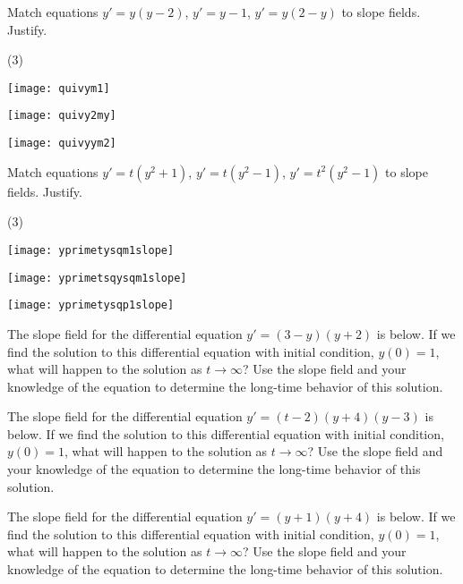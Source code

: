 \documentclass{ximera}
\begin{document}
\begin{exercise}
    Match equations $y'=y(y-2)$, $y'=y-1$, $y' = y(2-y)$ to slope fields. Justify.
    \begin{tasks}(3)
        \task \parbox[c]{1.75in}{\texttt{[image: quivym1]}}
        \task \parbox[c]{1.75in}{\texttt{[image: quivy2my]}}
        \task \parbox[c]{1.75in}{\texttt{[image: quivyym2]}}
    \end{tasks}
\end{exercise}

\begin{exercise}
    Match equations $y'=t(y^2 + 1)$, $y'=t(y^2 - 1)$, $y' = t^2(y^2 - 1)$ to slope fields. Justify.
    \begin{tasks}(3)
        \task \parbox[c]{1.75in}{\texttt{[image: yprimetysqm1slope]}}
        \task \parbox[c]{1.75in}{\texttt{[image: yprimetsqysqm1slope]}}
        \task \parbox[c]{1.75in}{\texttt{[image: yprimetysqp1slope]}}
    \end{tasks}
\end{exercise}

\begin{exercise}\label{ex:3myyp2}
    The slope field for the differential equation $y' = (3-y)(y+2)$ is below.  If we find the solution to this differential equation with initial condition, $y(0) = 1$, what will happen to the solution as $t \rightarrow \infty$? Use the slope field and your knowledge of the equation to determine the long-time behavior of this solution.
\end{exercise}

\begin{exercise}\label{ex:tm2yp4ym3}
    The slope field for the differential equation $y' = (t-2)(y+4)(y-3)$ is below. If we find the solution to this differential equation with initial condition, $y(0) = 1$, what will happen to the solution as $t \rightarrow \infty$? Use the slope field and your knowledge of the equation to determine the long-time behavior of this solution.
\end{exercise}

\begin{exercise}\label{ex:yp1yp4}
    The slope field for the differential equation $y' = (y+1)(y+4)$ is below. If we find the solution to this differential equation with initial condition, $y(0) = 1$, what will happen to the solution as $t \rightarrow \infty$? Use the slope field and your knowledge of the equation to determine the long-time behavior of this solution.
\end{exercise}
\end{document}
